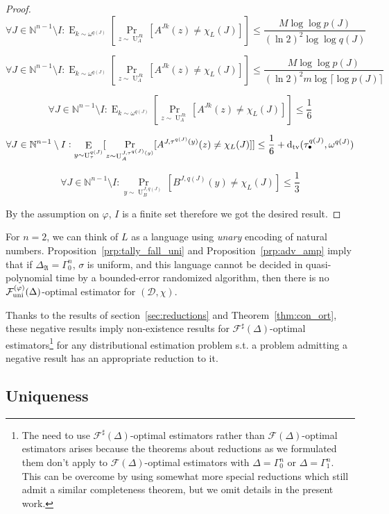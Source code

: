 \documentclass[11pt]{article}
\numberwithin{equation}{section}
\theoremstyle{definition}
\theoremstyle{plain}
\DeclareMathOperator{\Prb}{Pr}
\DeclareMathOperator{\E}{E}
\DeclareMathOperator{\Un}{U}
\newcommand{\Dtv}{\operatorname{d}_{\textnormal{tv}}}
\newcommand{\Nats}{\mathbb{N}}
\newcommand{\Ceil}[1]{\lceil #1 \rceil}
\newcommand{\Dist}{\mathcal{D}}
\newcommand{\Fall}{\mathcal{F}}
\newcommand{\FallUt}[1]{{\Fall_{\textnormal{uni}}^{(#1)}}}
\begin{document}
\begin{proof}
\[\forall J \in \Nats^{n-1} \setminus I:\E_{k \sim \omega^{q(J)}}[\Prb_{z \sim \Un_A^{Jk}}[A^{Jk}(z) \neq \chi_L(J)]] \leq \frac{M \log \log p(J)}{(\ln 2)^2 \log \log q(J)}\]

\[\forall J \in \Nats^{n-1} \setminus I: \E_{k \sim \omega^{q(J)}}[\Prb_{z \sim \Un_A^{Jk}}[A^{Jk}(z) \neq \chi_L(J)]] \leq \frac{M \log \log p(J)}{(\ln 2)^2 m \log \Ceil{\log p(J)}}\]

\[\forall J \in \Nats^{n-1} \setminus I: \E_{k \sim \omega^{q(J)}}[\Prb_{z \sim \Un_A^{Jk}}[A^{Jk}(z) \neq \chi_L(J)]] \leq \frac{1}{6}\]

\[\forall J \in \Nats^{n-1} \setminus I: \E_{y \sim \Un_\tau^{q(J)}}[\Prb_{z \sim \Un_A^{J,\tau^{q(J)}(y)}}[A^{J,\tau^{q(J)}(y)}(z) \neq \chi_L(J)]] \leq \frac{1}{6}+\Dtv(\tau_\bullet^{q(J)},\omega^{q(J)})\]

\[\forall J \in \Nats^{n-1} \setminus I: \Prb_{y \sim \Un_B^{J,q(J)}}[B^{J,q(J)}(y) \ne \chi_L(J)] \leq \frac{1}{3}\]

By the assumption on ${\varphi}$, ${I}$ is a finite set therefore we got the desired result.
%
\end{proof}

For ${n=2}$, we can think of ${L}$ as a language using \emph{unary} encoding of natural numbers. Proposition~\ref{prp:tally_fall_uni} and Proposition~\ref{prp:adv_amp} imply that if ${\Delta_{\mathfrak{A}}=\Gamma_0^n}$, ${\sigma}$ is uniform, and this language cannot be decided in quasi-polynomial time by a bounded-error randomized algorithm, then there is no ${\FallUt{\varphi}(\Delta)}$-optimal estimator for ${(\Dist,\chi)}$.

Thanks to the results of section~\ref{sec:reductions} and Theorem~\ref{thm:con_ort}, these negative results imply non-existence results for ${\Fall^\sharp(\Delta)}$-optimal estimators\footnote{The need to use ${\Fall^\sharp(\Delta)}$-optimal estimators rather than ${\Fall(\Delta)}$-optimal estimators arises because the theorems about reductions as we formulated them don't apply to ${\Fall(\Delta)}$-optimal estimators with ${\Delta=\Gamma_0^n}$ or ${\Delta=\Gamma_1^n}$. This can be overcome by using somewhat more special reductions which still admit a similar completeness theorem, but we omit details in the present work.} for any distributional estimation problem s.t. a problem admitting a negative result has an appropriate reduction to it.

\subsection{Uniqueness}
\end{document}
